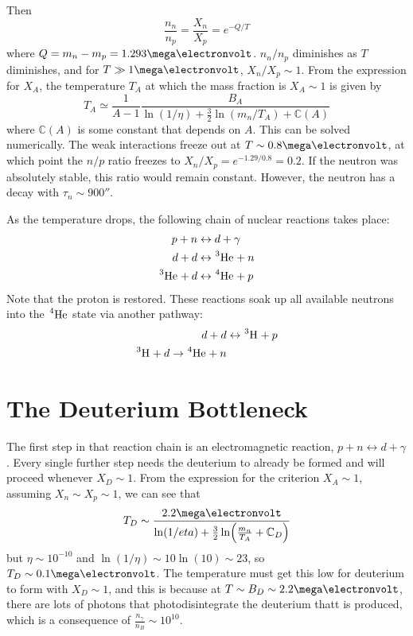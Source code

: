 \documentclass[a4paper,twoside,master.tex]{subfiles}
\begin{document}
Then
\begin{equation}
    \frac{n_n}{n_p} = \frac{X_n}{X_p} = e^{- Q / T}
\end{equation}
where $ Q = m_n - m_p = 1.293 \mega\electronvolt $. $ n_n / n_p $ diminishes as $ T $ diminishes, and for $ T \gg 1 \mega\electronvolt $, $ X_n / X_p \sim 1 $. From the expression for $ X_A $, the temperature $ T_A $ at which the mass fraction is $ X_A \sim 1 $ is given by
\begin{equation}
    T_A \simeq \frac{1}{A - 1} \frac{B_A}{\ln(1/\eta) + \frac{3}{2} \ln(m_n / T_A) + \mathbb{C}(A)}
\end{equation}
where $ \mathbb{C}(A) $ is some constant that depends on $ A $. This can be solved numerically. The weak interactions freeze out at $ T \sim 0.8 \mega\electronvolt $, at which point the $ n/p $ ratio freezes to $ X_n / X_p = e^{-1.29/0.8} = 0.2 $. If the neutron was absolutely stable, this ratio would remain constant. However, the neutron has a decay with $ \tau_n \sim 900\second $.

As the temperature drops, the following chain of nuclear reactions takes place:
\begin{align}
    p + n &\leftrightarrow d + \gamma \\
    d + d &\leftrightarrow \nuclide[3]{He} + n \\
    \nuclide[3]{He} + d &\leftrightarrow \nuclide[4]{He} + p
\end{align}
Note that the proton is restored. These reactions soak up all available neutrons into the $ \nuclide[4]{He} $ state via another pathway:
\begin{align}
    d + d &\leftrightarrow \nuclide[3]{H} + p \\
    \nuclide[3]{H} + d \to \nuclide[4]{He} + n
\end{align}

\section{The Deuterium Bottleneck}\label{sec:the_deuterium_bottleneck}

The first step in that reaction chain is an electromagnetic reaction, $ p + n \leftrightarrow d + \gamma $. Every single further step needs the deuterium to already be formed and will proceed whenever $ X_D \sim 1 $. From the expression for the criterion $ X_A \sim 1 $, assuming $ X_n \sim X_p \sim 1 $, we can see that
\begin{equation}
    T_D \sim \frac{2.2 \mega\electronvolt}{\ln(1/eta) + \frac{3}{2} \ln(\frac{m_n}{T_A} + \mathbb{C}_D)}
\end{equation}
but $ \eta \sim 10^{-10} $ and $ \ln(1 / \eta) \sim 10 \ln(10) \sim 23 $, so $ T_D \sim 0.1 \mega\electronvolt $. The temperature must get this low for deuterium to form with $ X_D \sim 1 $, and this is because at $ T \sim B_D \sim 2.2 \mega\electronvolt $, there are lots of photons that photodisintegrate the deuterium thatt is produced, which is a consequence of $ \frac{n_{\gamma}}{n_{B}} \sim 10^{10} $.
\end{document}

